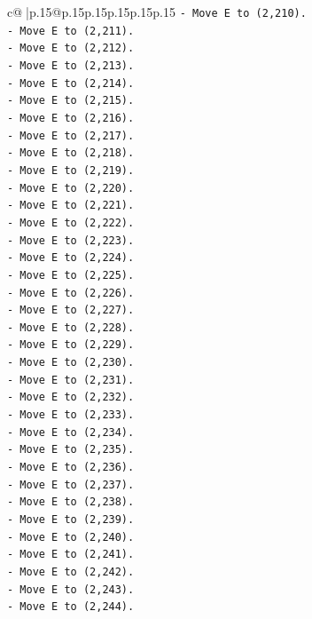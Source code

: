 \documentclass{article}
\begin{document}
{\begin{supertabular}{c@{$\;$}|p{.15\linewidth}@{}p{.15\linewidth}p{.15\linewidth}p{.15\linewidth}p{.15\linewidth}p{.15\linewidth}}
{{{\texttt{{-} Move E to (2,210).} \\
\texttt{{-} Move E to (2,211).} \\
\texttt{{-} Move E to (2,212).} \\
\texttt{{-} Move E to (2,213).} \\
\texttt{{-} Move E to (2,214).} \\
\texttt{{-} Move E to (2,215).} \\
\texttt{{-} Move E to (2,216).} \\
\texttt{{-} Move E to (2,217).} \\
\texttt{{-} Move E to (2,218).} \\
\texttt{{-} Move E to (2,219).} \\
\texttt{{-} Move E to (2,220).} \\
\texttt{{-} Move E to (2,221).} \\
\texttt{{-} Move E to (2,222).} \\
\texttt{{-} Move E to (2,223).} \\
\texttt{{-} Move E to (2,224).} \\
\texttt{{-} Move E to (2,225).} \\
\texttt{{-} Move E to (2,226).} \\
\texttt{{-} Move E to (2,227).} \\
\texttt{{-} Move E to (2,228).} \\
\texttt{{-} Move E to (2,229).} \\
\texttt{{-} Move E to (2,230).} \\
\texttt{{-} Move E to (2,231).} \\
\texttt{{-} Move E to (2,232).} \\
\texttt{{-} Move E to (2,233).} \\
\texttt{{-} Move E to (2,234).} \\
\texttt{{-} Move E to (2,235).} \\
\texttt{{-} Move E to (2,236).} \\
\texttt{{-} Move E to (2,237).} \\
\texttt{{-} Move E to (2,238).} \\
\texttt{{-} Move E to (2,239).} \\
\texttt{{-} Move E to (2,240).} \\
\texttt{{-} Move E to (2,241).} \\
\texttt{{-} Move E to (2,242).} \\
\texttt{{-} Move E to (2,243).} \\
\texttt{{-} Move E to (2,244).} \\
}}}
\end{supertabular}}
\end{document}
